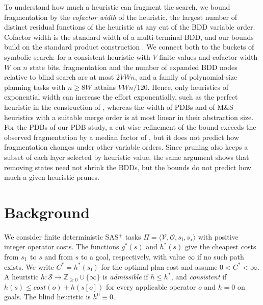 \documentclass[letterpaper]{article}
\newcommand{\task}{\ensuremath{\Pi}}
\newcommand{\vars}{\ensuremath{\mathcal{V}}}
\newcommand{\ops}{\ensuremath{\mathcal{O}}}
\newcommand{\states}{\ensuremath{\mathcal{S}}}
\newcommand{\sinit}{\ensuremath{s_{\mathrm{I}}}}
\newcommand{\sgoal}{\ensuremath{s_\star}}
\newcommand{\cost}{\ensuremath{\mathit{cost}}}
\newcommand{\hstar}{\ensuremath{h^{*}}}
\newcommand{\hblind}{\ensuremath{h^{0}}}
\newcommand{\gstar}{\ensuremath{g^{*}}}
\newcommand{\copt}{\ensuremath{C^{*}}}
\theoremstyle{plain}
\theoremstyle{definition}
\theoremstyle{remark}
\begin{document}
To understand how much a heuristic can fragment the search, we bound fragmentation by the \emph{cofactor width} of the heuristic, the largest number of distinct residual functions of the heuristic at any cut of the BDD variable order.
Cofactor width is the standard width of a multi-terminal BDD, and our bounds build on the standard product construction \citep{wegener-2000}.
We connect both to the buckets of symbolic search: for a consistent heuristic with $V$ finite values and cofactor width $W$ on $n$ state bits, fragmentation and the number of expanded BDD nodes relative to blind search are at most $2VWn$, and a family of polynomial-size planning tasks with $n\geq8W$ attains $VWn/120$.
Hence, only heuristics of exponential width can increase the effort exponentially, such as the perfect heuristic in the construction of \citet{speck-et-al-icaps2020}, whereas the width of PDBs and of M\&S heuristics with a suitable merge order is at most linear in their abstraction size.
For the PDBs of our PDB study, a cut-wise refinement of the bound exceeds the observed fragmentation by a median factor of \SlackProfileMedian, but it does not predict how fragmentation changes under other variable orders.
Since pruning also keeps a subset of each layer selected by heuristic value, the same argument shows that removing states need not shrink the BDDs, but the bounds do not predict how much a given heuristic prunes.

\section{Background}

We consider finite deterministic SAS$^{+}$ tasks $\task=\langle\vars,\ops,\sinit,\sgoal\rangle$ \citep{backstrom-nebel-compint1995} with positive integer operator costs.
The functions $\gstar(s)$ and $\hstar(s)$ give the cheapest costs from \sinit\ to $s$ and from $s$ to a goal, respectively, with value $\infty$ if no such path exists.
We write $\copt=\hstar(\sinit)$ for the optimal plan cost and assume $0<\copt<\infty$.
A heuristic $h\colon\states\to\mathbb Z_{\geq0}\cup\{\infty\}$ is \emph{admissible} if $h\leq\hstar$, and \emph{consistent} if $h(s)\leq\cost(o)+h(s[o])$ for every applicable operator $o$ and $h=0$ on goals.
The blind heuristic is $\hblind\equiv0$.
\end{document}
